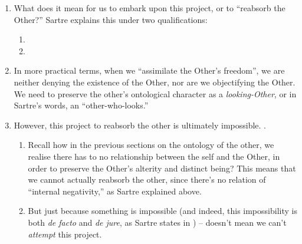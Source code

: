 \begin{enumerate}
\begin{enumerate}
  \end{enumerate}
  \item What does it mean for us to embark upon this project, or to \enquote{reabsorb the Other?} Sartre explains this under two qualifications:
  \begin{enumerate}
    \item {}
    \item {}
  \end{enumerate}
  \item In more practical terms, when we \enquote{assimilate the Other's freedom}, we are neither denying the existence of the Other, nor are we objectifying the Other. We need to preserve the other's ontological character as a \emph{looking-Other}, or in Sartre's words, an \enquote{other-who-looks.}
  \item However, this project to reabsorb the other is ultimately impossible. .
  \begin{enumerate}
    \item Recall how in the previous sections on the ontology of the other, we realise there has to no relationship between the self and the Other, in order to preserve the Other's alterity and distinct being? This means that we cannot actually reabsorb the other, since there's no relation of \enquote{internal negativity,} as Sartre explained above.
    \item But just because something is impossible (and indeed, this impossibility is both \emph{de facto} and \emph{de jure}, as Sartre states in \autocite[485]{sartre}) -- doesn't mean we can't \emph{attempt} this project.
  \end{enumerate}

\end{enumerate}
